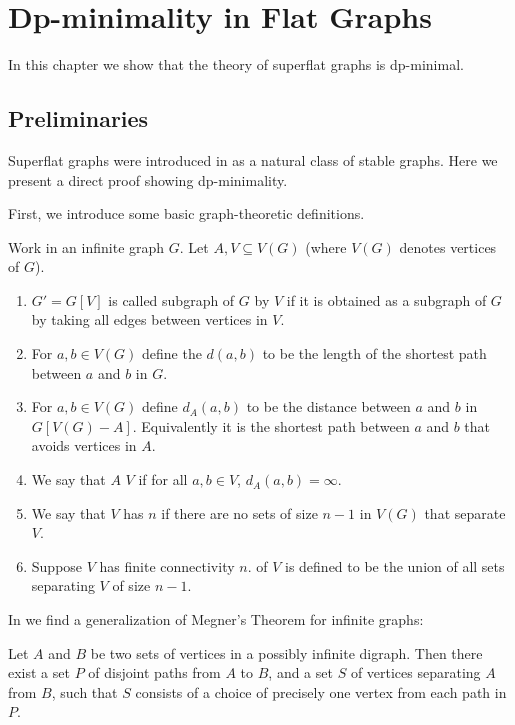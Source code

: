 \chapter{Dp-minimality in Flat Graphs}

In this chapter we show that the theory of superflat graphs is dp-minimal.

\section{Preliminaries}

Superflat graphs were introduced in \cite{stable_graphs} as a natural class of stable graphs. Here we present a direct proof showing dp-minimality.

First, we introduce some basic graph-theoretic definitions.
\begin{Definition}
  Work in an infinite graph $G$. Let $A, V \subseteq V(G)$ (where $V(G)$ denotes vertices of $G$).
  \begin{enumerate}
  \item $G' = G[V]$ is called  subgraph of $G$  by $V$ if it is obtained as a subgraph of $G$ by taking all edges between vertices in $V$.
  \item For $a,b \in V(G)$ define the  $d(a,b)$ to be the length of the shortest path between $a$ and $b$ in $G$.
  \item For $a,b \in V(G)$ define $d_A(a,b)$ to be the distance between $a$ and $b$ in $G[V(G) - A]$. Equivalently it is the shortest path between $a$ and $b$ that avoids vertices in $A$.
  \item We say that $A$  $V$ if for all $a,b \in V$, $d_A(a,b) = \infty$.
  \item We say that $V$ has  $n$ if there are no sets of size $n-1$ in $V(G)$ that separate $V$.
  \item Suppose $V$ has finite connectivity $n$.  of $V$ is defined to be the union of all sets separating $V$ of size $n-1$.
  \end{enumerate}
\end{Definition}

In \cite{infinite_megner} we find a generalization of Megner's Theorem for infinite graphs:

\begin{Theorem}
  Let $A$ and $B$ be two sets of vertices in a possibly infinite digraph. Then there exist a set $P$ of disjoint paths from $A$ to $B$, and a set $S$ of vertices separating $A$ from $B$, such that $S$ consists of a choice of precisely one vertex from each path in $P$.
\end{Theorem}

